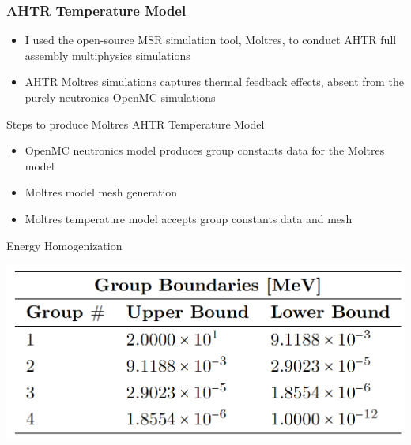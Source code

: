 \begin{frame}
    \frametitle{AHTR Temperature Model}
    \begin{itemize}
        \item I used the open-source MSR simulation tool, Moltres, to conduct AHTR
        full assembly multiphysics simulations 
        \item AHTR Moltres simulations captures thermal feedback effects, absent
        from the purely neutronics OpenMC simulations
    \end{itemize}

    \begin{block}{Steps to produce Moltres AHTR Temperature Model}
        \begin{itemize}
          \item OpenMC neutronics model produces group constants data for the Moltres model
          \item Moltres model mesh generation
          \item Moltres temperature model accepts group constants data and mesh
        \end{itemize}
        \end{block}

    \begin{block}{Energy Homogenization}
        \begin{table}[]
            \centering
            \begin{minipage}[c]{0.6\textwidth}
                \centering
                \includegraphics[width=0.7\linewidth]{figures/ahtr-energy-discr.png}
            \end{minipage}\hfill
            \begin{minipage}[c]{0.4\textwidth}
            \caption{4-group energy structures for AHTR geometry 
            derived by \cite{gentry_development_2016}.}
        \end{minipage}
        \end{table}
    \end{block}
\end{frame}

